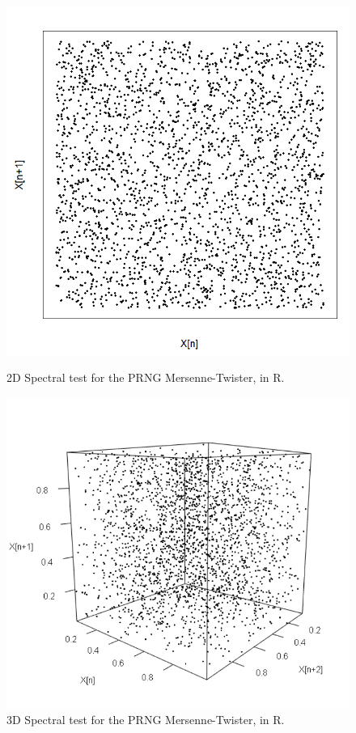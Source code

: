 \begin{figure}
	\centering
	\begin{minipage}{0.45\textwidth}
		\centering
		\includegraphics[width=\linewidth]{billder/ms_spec_2d.png}
		\caption{2D Spectral test for the PRNG Mersenne-Twister, in R.}
		\label{fig:msspec2d}
	\end{minipage}\hfill
	\begin{minipage}{0.45\textwidth}
		\centering
		\includegraphics[width=\linewidth]{billder/ms_spec_3d.png}
		\caption{3D Spectral test for the PRNG Mersenne-Twister, in R.}
		\label{fig:msspec3d}
	\end{minipage}
\end{figure}

\newpage
